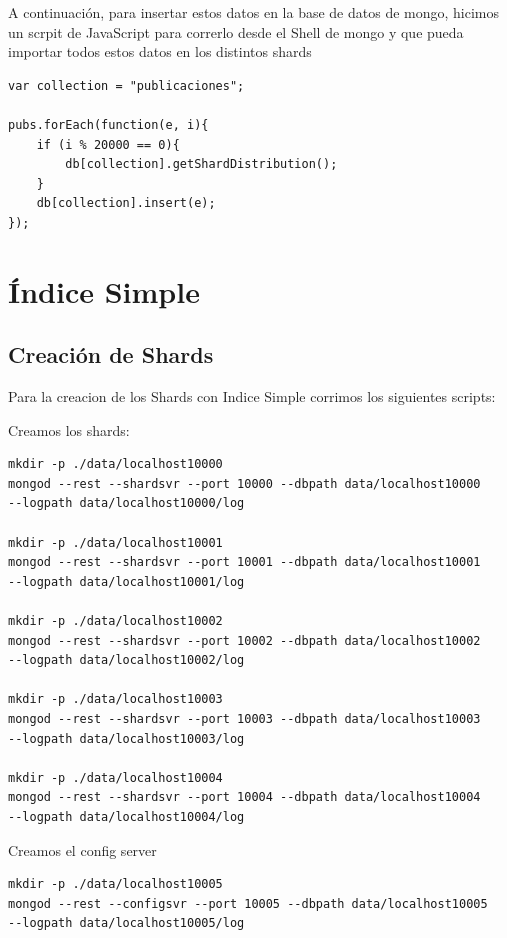 \documentclass[a4paper, 10pt, twoside]{article}
\begin{document}
A continuaci\'on, para insertar estos datos en la base de datos de mongo, hicimos un scrpit de JavaScript para correrlo desde el Shell de mongo y que pueda importar todos estos datos en los distintos shards


\begin{lstlisting}[caption=Ejercicio 6]
var collection = "publicaciones";

pubs.forEach(function(e, i){
    if (i % 20000 == 0){
        db[collection].getShardDistribution();
    }
    db[collection].insert(e);
});
\end{lstlisting}


\section{\'Indice Simple}

\subsection{Creaci\'on de Shards}

Para la creacion de los Shards con Indice Simple corrimos los siguientes scripts:

Creamos los shards:

\begin{verbatim}
mkdir -p ./data/localhost10000
mongod --rest --shardsvr --port 10000 --dbpath data/localhost10000 
--logpath data/localhost10000/log

mkdir -p ./data/localhost10001
mongod --rest --shardsvr --port 10001 --dbpath data/localhost10001 
--logpath data/localhost10001/log

mkdir -p ./data/localhost10002
mongod --rest --shardsvr --port 10002 --dbpath data/localhost10002 
--logpath data/localhost10002/log

mkdir -p ./data/localhost10003
mongod --rest --shardsvr --port 10003 --dbpath data/localhost10003 
--logpath data/localhost10003/log

mkdir -p ./data/localhost10004
mongod --rest --shardsvr --port 10004 --dbpath data/localhost10004 
--logpath data/localhost10004/log

\end{verbatim}


Creamos el config server 

\begin{verbatim}
mkdir -p ./data/localhost10005
mongod --rest --configsvr --port 10005 --dbpath data/localhost10005 
--logpath data/localhost10005/log
\end{verbatim}
\end{document}
